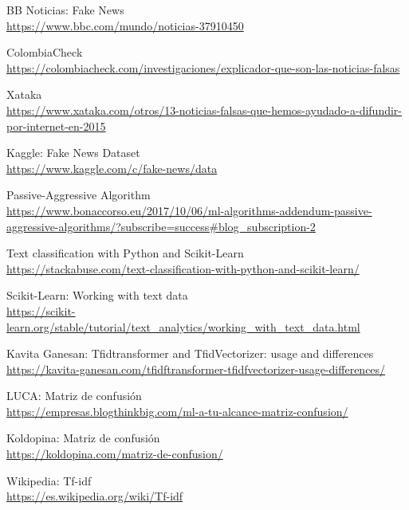 \documentclass[letterpaper,11pt]{article}
\begin{document}
\begin{thebibliography}{9} 
    BB Noticias: Fake News \\
    \url{https://www.bbc.com/mundo/noticias-37910450}

    ColombiaCheck \\ 
    \url{https://colombiacheck.com/investigaciones/explicador-que-son-las-noticias-falsas}

    Xataka \\ 
    \url{https://www.xataka.com/otros/13-noticias-falsas-que-hemos-ayudado-a-difundir-por-internet-en-2015}

    Kaggle: Fake News Dataset \\ 
    \url{https://www.kaggle.com/c/fake-news/data}

    Passive-Aggressive Algorithm \\ 
    \url{https://www.bonaccorso.eu/2017/10/06/ml-algorithms-addendum-passive-aggressive-algorithms/?subscribe=success#blog_subscription-2}

    Text classification with Python and Scikit-Learn \\ 
    \url{https://stackabuse.com/text-classification-with-python-and-scikit-learn/}

    Scikit-Learn: Working with text data \\ 
    \url{https://scikit-learn.org/stable/tutorial/text_analytics/working_with_text_data.html}

    Kavita Ganesan: Tfidtransformer and TfidVectorizer: usage and differences \\
    \url{https://kavita-ganesan.com/tfidftransformer-tfidfvectorizer-usage-differences/}

    LUCA: Matriz de confusión \\
    \url{https://empresas.blogthinkbig.com/ml-a-tu-alcance-matriz-confusion/}

    Koldopina: Matriz de confusión \\
    \url{https://koldopina.com/matriz-de-confusion/}

    Wikipedia: Tf-idf \\ 
    \url{https://es.wikipedia.org/wiki/Tf-idf}
\end{thebibliography}
\end{document}
